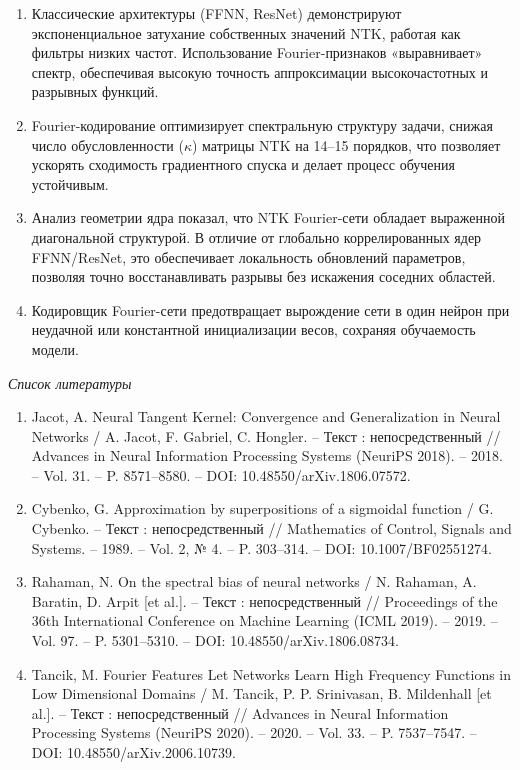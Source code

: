\documentclass[a4paper,14pt]{extarticle}
\numberwithin{equation}{section}
\begin{document}
\begin{enumerate}
    \item Классические архитектуры (FFNN, ResNet) демонстрируют экспоненциальное затухание собственных значений NTK, работая как фильтры низких частот. Использование Fourier-признаков «выравнивает» спектр, обеспечивая высокую точность аппроксимации высокочастотных и разрывных функций.
    \item Fourier-кодирование оптимизирует спектральную структуру задачи, снижая число обусловленности ($\kappa$) матрицы NTK на 14–15 порядков, что позволяет ускорять сходимость градиентного спуска и делает процесс обучения устойчивым.
    \item Анализ геометрии ядра показал, что NTK Fourier-сети обладает выраженной диагональной структурой. В отличие от глобально коррелированных ядер FFNN/ResNet, это обеспечивает локальность обновлений параметров, позволяя точно восстанавливать разрывы без искажения соседних областей.
    \item Кодировщик Fourier-сети предотвращает вырождение сети в один нейрон при неудачной или константной инициализации весов, сохраняя обучаемость модели.
\end{enumerate}

\begin{center}
    \textit{Список литературы}
\end{center}

\begin{enumerate}
    \item Jacot, A. Neural Tangent Kernel: Convergence and Generalization in Neural Networks / A. Jacot, F. Gabriel, C. Hongler. – Текст : непосредственный // Advances in Neural Information Processing Systems (NeuriPS 2018). – 2018. – Vol. 31. – P. 8571–8580. – DOI: 10.48550/arXiv.1806.07572.
    \item Cybenko, G. Approximation by superpositions of a sigmoidal function / G. Cybenko. – Текст : непосредственный // Mathematics of Control, Signals and Systems. – 1989. – Vol. 2, № 4. – P. 303–314. – DOI: 10.1007/BF02551274.
    \item Rahaman, N. On the spectral bias of neural networks / N. Rahaman, A. Baratin, D. Arpit [et al.]. – Текст : непосредственный // Proceedings of the 36th International Conference on Machine Learning (ICML 2019). – 2019. – Vol. 97. – P. 5301–5310. – DOI: 10.48550/arXiv.1806.08734.
    \item Tancik, M. Fourier Features Let Networks Learn High Frequency Functions in Low Dimensional Domains / M. Tancik, P. P. Srinivasan, B. Mildenhall [et al.]. – Текст : непосредственный // Advances in Neural Information Processing Systems (NeuriPS 2020). – 2020. – Vol. 33. – P. 7537–7547. – DOI: 10.48550/arXiv.2006.10739.
\end{enumerate}
\end{document}
